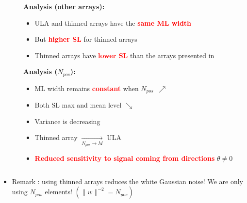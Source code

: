 \documentclass[UKenglish,8pt,aspectratio=1610]{beamer}
\begin{document}
\begin{frame}
\begin{columns}
\begin{column}{0.7\textwidth}
	\end{column}
	
	\begin{column}{0.3\textwidth}
		\textbf{Analysis (other arrays):}
		\begin{itemize}
			\item ULA and thinned arrays have the \textcolor{red}{\textbf{same ML width}}
			\item But \textcolor{red}{\textbf{higher SL}} for thinned arrays
			\item Thinned arrays have \textcolor{red}{\textbf{lower SL}} than the arrays presented in \cite{Optimization_of_sparse_arrays}
		\end{itemize}
		\textbf{Analysis ($N_{pos}$): }
		\begin{itemize}
			\item ML width remains \textcolor{red}{\textbf{ constant}} when $N_{pos}$~$\nearrow$
			\item Both SL max and mean level $\searrow$
			\item Variance is decreasing
			\item Thinned array $\xrightarrow[N_{pos} \to M]{}$ ULA
			\item \textcolor{red}{\textbf{Reduced sensitivity to signal coming from directions}} $\theta\neq 0$
		\end{itemize}
		
	\end{column}
\end{columns}

\begin{itemize}
	\item Remark : using thinned arrays reduces the white Gaussian noise! We are only using $N_{pos}$ elements! $\left(\rVert w\rVert^{-2} = N_{pos}\right)$
\end{itemize}
		
	

\end{frame}
\end{document}
